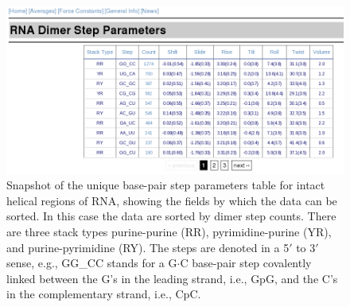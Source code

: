 \begin{figure}[htbp]
\centering
\includegraphics[angle=0, scale=0.5]{Chapter4/average.png}
\caption{Snapshot of  the unique  base-pair step parameters  table for
intact helical  regions of RNA, showing  the fields by  which the data
can  be  sorted. In  this  case  the data  are  sorted  by dimer  step
counts.   There   are    three   stack   types   purine-purine   (RR),
pyrimidine-purine  (YR),  and purine-pyrimidine  (RY).  The steps  are
denoted in a  5$'$ to 3$'$ sense, e.g., GG\_CC  stands for a G$\cdot$C
base-pair  step  covalently linked  between  the  G's  in the  leading
strand,  i.e., GpG,  and the  C's in  the complementary  strand, i.e.,
CpC.}
\label{fig:average}
\end{figure}  

